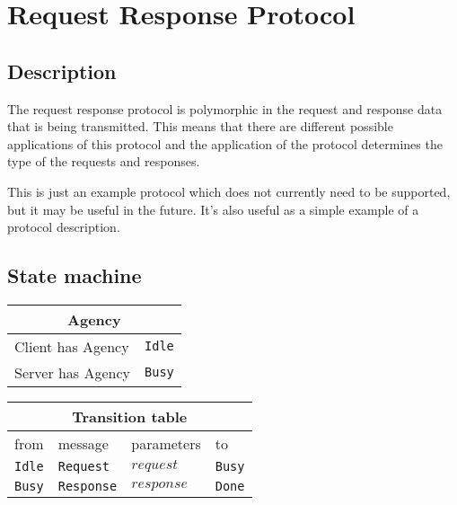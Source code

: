 \documentclass{report}
\newcommand{\hsref}[1]{}
\newcommand{\state}[1]{\texttt{#1}}
\newcommand{\msg}[1]{\texttt{#1}}
\newcommand{\Idle}{\state{Idle}}
\newcommand{\Busy}{\state{Busy}}
\newcommand{\Done}{\state{Done}}
\theoremstyle{definition}{
  \newtheorem{lemma}{Lemma}[section] %
  \newtheorem{definition}[lemma]{Definition}
}
\theoremstyle{theorem}{
  \newtheorem{invariant}[lemma]{Invariant}
  \newtheorem{proofobligation}[lemma]{Proof Obligation}
}
\numberwithin{equation}{lemma}
\begin{document}
\section{Request Response Protocol}
\label{request-response-protocol}
\renewcommand{\Idle}{\state{Idle}}
\renewcommand{\Busy}{\state{Busy}}
\renewcommand{\Done}{\state{Done}}
\newcommand{\Request}{\msg{Request}}
\newcommand{\Response}{\msg{Response}}

\subsection{Description}
The request response protocol is polymorphic in the request and response data that is being transmitted.
This means that there are different possible applications of this protocol and the
application of the protocol determines the type of the requests and responses.

This is just an example protocol which does not currently need to be supported, but it
may be useful in the future.  It's also useful as a simple example of
a protocol description.

\subsection{State machine}
\hsref{ouroboros-network/src/Ouroboros/Network/Protocol/ReqResp/Type.hs}

\begin{tabular}{|l|l|}
  \hline
  \multicolumn{2}{|c|}{Agency} \\ \hline
  Client has Agency & \Idle \\  \hline
  Server has Agency & \Busy \\ \hline
\end{tabular}


\begin{tabular}{|l|l|l|l|} \hline
\multicolumn{4}{|c|}{Transition table} \\ \hline
  from         & message            & parameters             & to       \\ \hline\hline
  \Idle        & \Request           & $request$              & \Busy     \\ \hline
  \Busy        & \Response          & $response$             & \Done     \\ \hline
\end{tabular}
\end{document}
